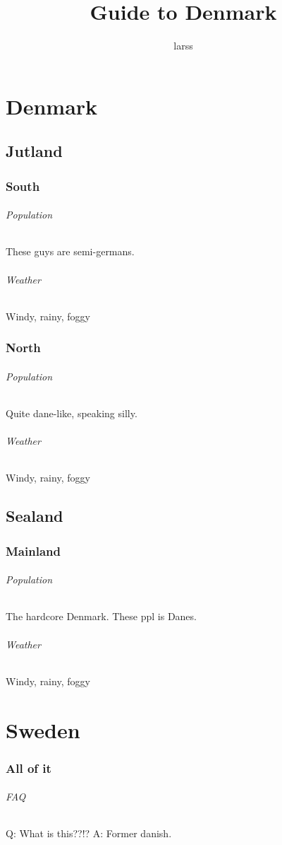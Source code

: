 \documentclass{book}
\begin{document}
\title{Guide to Denmark}
\author{larss}
\date{}
\maketitle

\part{Denmark}
\chapter{Jutland}
\section{South}
\paragraph{Population}
These guys are semi-germans.
\paragraph{Weather}
Windy, rainy, foggy

\section{North}
\paragraph{Population}
Quite dane-like, speaking silly.
\paragraph{Weather}
Windy, rainy, foggy

\chapter{Sealand}
\section{Mainland}
\paragraph{Population}
The hardcore Denmark. These ppl is Danes.
\paragraph{Weather}
Windy, rainy, foggy

\part{Sweden}
\section{All of it}
\paragraph{FAQ}
Q: What is this??!?
A: Former danish.
\end{document}
